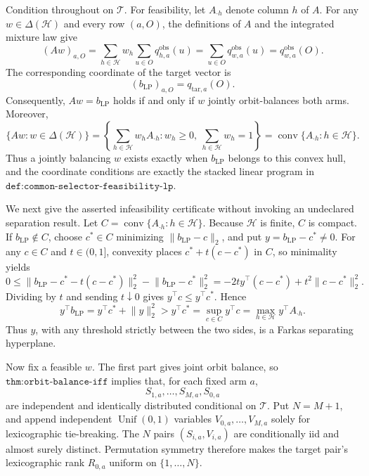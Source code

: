 Condition throughout on \(\mathcal T\). For feasibility, let \(A_{\cdot h}\) denote column \(h\) of \(A\). For any \(w\in\Delta(\mathcal H)\) and every row \((a,O)\), the definitions of \(A\) and the integrated mixture law give
\[
(Aw)_{a,O}=\sum_{h\in\mathcal H}w_h\sum_{u\in O}q^{\mathrm{obs}}_{h,a}(u)=\sum_{u\in O}q^{\mathrm{obs}}_{w,a}(u)=q^{\mathrm{obs}}_{w,a}(O).
\]
The corresponding coordinate of the target vector is
\[
(b_{\mathrm{LP}})_{a,O}=q_{\mathrm{tar},a}(O).
\]
Consequently, \(Aw=b_{\mathrm{LP}}\) holds if and only if \(w\) jointly orbit-balances both arms. Moreover,
\[
\{Aw:w\in\Delta(\mathcal H)\}=\left\{\sum_{h\in\mathcal H}w_hA_{\cdot h}:w_h\ge0,\ \sum_{h\in\mathcal H}w_h=1\right\}=\operatorname{conv}\{A_{\cdot h}:h\in\mathcal H\}.
\]
Thus a jointly balancing \(w\) exists exactly when \(b_{\mathrm{LP}}\) belongs to this convex hull, and the coordinate conditions are exactly the stacked linear program in \(\texttt{def:common-selector-feasibility-lp}\).

We next give the asserted infeasibility certificate without invoking an undeclared separation result. Let \(C=\operatorname{conv}\{A_{\cdot h}:h\in\mathcal H\}\). Because \(\mathcal H\) is finite, \(C\) is compact. If \(b_{\mathrm{LP}}\notin C\), choose \(c^*\in C\) minimizing \(\lVert b_{\mathrm{LP}}-c\rVert_2\), and put \(y=b_{\mathrm{LP}}-c^*\ne0\). For any \(c\in C\) and \(t\in(0,1]\), convexity places \(c^*+t(c-c^*)\) in \(C\), so minimality yields
\[
0\le \lVert b_{\mathrm{LP}}-c^*-t(c-c^*)\rVert_2^2-\lVert b_{\mathrm{LP}}-c^*\rVert_2^2=-2t y^\top(c-c^*)+t^2\lVert c-c^*\rVert_2^2.
\]
Dividing by \(t\) and sending \(t\downarrow0\) gives \(y^\top c\le y^\top c^*\). Hence
\[
y^\top b_{\mathrm{LP}}=y^\top c^*+\lVert y\rVert_2^2>y^\top c^*=\sup_{c\in C}y^\top c=\max_{h\in\mathcal H}y^\top A_{\cdot h}.
\]
Thus \(y\), with any threshold strictly between the two sides, is a Farkas separating hyperplane.

Now fix a feasible \(w\). The first part gives joint orbit balance, so \(\texttt{thm:orbit-balance-iff}\) implies that, for each fixed arm \(a\),
\[
S_{1,a},\ldots,S_{M,a},S_{0,a}
\]
are independent and identically distributed conditional on \(\mathcal T\). Put \(N=M+1\), and append independent \(\operatorname{Unif}(0,1)\) variables \(V_{0,a},\ldots,V_{M,a}\) solely for lexicographic tie-breaking. The \(N\) pairs \((S_{i,a},V_{i,a})\) are conditionally iid and almost surely distinct. Permutation symmetry therefore makes the target pair's lexicographic rank \(R_{0,a}\) uniform on \(\{1,\ldots,N\}\).

